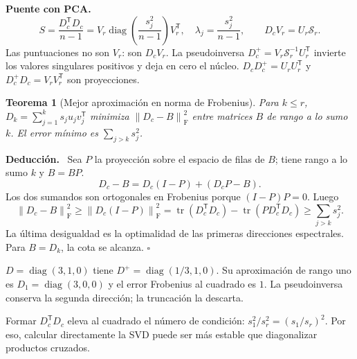\documentclass[11pt,a4paper]{article}
\newcommand{\T}{^{\mathsf T}}
\newcommand{\norm}[1]{\left\lVert #1\right\rVert}
\DeclareMathOperator{\tr}{tr}
\DeclareMathOperator{\diag}{diag}
\newcommand{\F}{_{\mathrm F}}
\newenvironment{deduccion}{\par\textbf{Deducción.}\ }{\hfill$\square$\par}
\newtheorem{teorema}{Teorema}[section]
\theoremstyle{definition}\newtheorem{definicion}[teorema]{Definición}
\begin{document}
\textbf{Puente con PCA.}
\[
S=\frac{D_c\T D_c}{n-1}
=V_r\diag\!\left(\frac{s_j^2}{n-1}\right)V_r\T,\quad
\lambda_j=\frac{s_j^2}{n-1},\qquad D_cV_r=U_r\mathcal S_r.
\]
Las puntuaciones no son $V_r$: son $D_cV_r$.
La pseudoinversa
$D_c^+=V_r\mathcal S_r^{-1}U_r\T$
invierte los valores singulares positivos y deja en cero el núcleo.
$D_cD_c^+=U_rU_r\T$ y $D_c^+D_c=V_rV_r\T$ son proyecciones.

\begin{teorema}[Mejor aproximación en norma de Frobenius]
Para $k\le r$, $D_k=\sum_{j=1}^ks_ju_jv_j\T$ minimiza
$\norm{D_c-B}\F^2$ entre matrices $B$ de rango a lo sumo $k$.
El error mínimo es $\sum_{j>k}s_j^2$.
\end{teorema}
\begin{deduccion}
Sea $P$ la proyección sobre el espacio de filas de $B$; tiene rango
a lo sumo $k$ y $B=BP$.
\[
D_c-B=D_c(I-P)+(D_cP-B).
\]
Los dos sumandos son ortogonales en Frobenius porque
$(I-P)P=0$. Luego
\[
\norm{D_c-B}\F^2\ge\norm{D_c(I-P)}\F^2
=\tr(D_c\T D_c)-\tr(PD_c\T D_c)
\ge\sum_{j>k}s_j^2.
\]
La última desigualdad es la optimalidad de las primeras direcciones
espectrales. Para $B=D_k$, la cota se alcanza.
\end{deduccion}
\begin{ejemplo}
$D=\diag(3,1,0)$ tiene $D^+=\diag(1/3,1,0)$.
Su aproximación de rango uno es $D_1=\diag(3,0,0)$ y el error
Frobenius al cuadrado es $1$.
La pseudoinversa conserva la segunda dirección; la truncación la descarta.
\end{ejemplo}
Formar $D_c\T D_c$ eleva al cuadrado el número de condición:
$s_1^2/s_r^2=(s_1/s_r)^2$.
Por eso, calcular directamente la SVD puede ser más estable que
diagonalizar productos cruzados.
\end{document}
